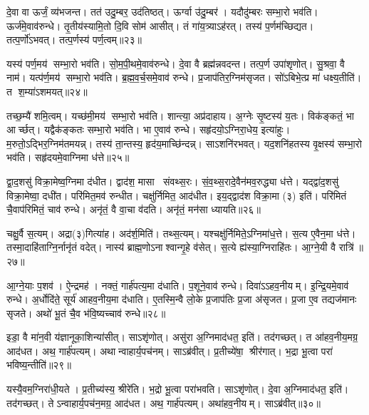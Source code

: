 दे॒वा वा ऊर्जं॒ व्य॑भजन्त। तत॑ उदु॒म्बर॒ उद॑तिष्ठत्। ऊर्ग्वा उ॑दु॒म्बर॑। यदौदु॑म्बरः सम्भा॒रो भव॑ति। ऊर्ज॑मे॒वाव॑रुन्धे। तृ॒तीय॑स्यामि॒तो दि॒वि सोम॑ आसीत्। तं गा॑य॒त्र्याऽह॑रत्। तस्य॑ प॒र्णम॑च्छिद्यत। तत्प॒र्णो॑ऽभवत्। तत्प॒र्णस्य॑ पर्ण॒त्वम्॥२३॥

यस्य॑ पर्ण॒मय॑ सम्भा॒रो भव॑ति। सो॒म॒पी॒थमे॒वाव॑रुन्धे। दे॒वा वै ब्रह्म॑न्नवदन्त। तत्प॒र्ण उपा॑शृणोत्। सु॒श्रवा॒ वै नाम॑। यत्प॑र्ण॒मय॑ सम्भा॒रो भव॑ति। ब्र॒ह्म॒व॒र्च॒समे॒वाव॑ रुन्धे। प्र॒जाप॑तिर॒ग्निम॑सृजत। सो॑ऽबिभे॒त्प्र मा॑ धक्ष्य॒तीति॑। त श॒म्या॑ऽशमयत्॥२४॥

तच्छ॒म्यै॑ शमि॒त्वम्। यच्छ॑मी॒मय॑ सम्भा॒रो भव॑ति। शान्त्या॒ अप्र॑दाहाय। अ॒ग्नेः सृ॒ष्टस्य॑ य॒तः। विक॑ङ्कतं॒ भा आर्च्छत्। यद्वैक॑ङ्कतः सम्भा॒रो भव॑ति। भा ए॒वाव॑ रुन्धे। सहृ॑दयो॒ऽग्निरा॒धेय॒ इत्या॑हुः। म॒रुतो॒ऽद्भिर॒ग्निम॑तमयन्न्। तस्य॑ ता॒न्तस्य॒ हृद॑य॒माच्छि॑न्दन्न्। साऽशनि॑रभवत्। यद॒शनि॑हतस्य वृ॒क्षस्य॑ सम्भा॒रो भव॑ति। सहृ॑दयमे॒वाग्निमा ध॑त्ते॥२५॥

द्वा॒द॒शसु॑ विक्रा॒मेष्व॒ग्निमा द॑धीत। द्वाद॑श॒ मासा संवथ्स॒रः। सं॒व॒थ्स॒रादे॒वैन॑मव॒रुद्ध्या ध॑त्ते। यद्द्वा॑द॒शसु॑ विक्रा॒मेष्वा॒ दधी॑त। परि॑मित॒मव॑ रुन्धीत। चक्षु॑र्निमित॒ आद॑धीत। इय॒द्द्वाद॑श विक्रा॒मा (३) इति॑। परि॑मितं चै॒वाप॑रिमितं॒ चाव॑ रुन्धे। अनृ॑तं॒ वै वा॒चा व॑दति। अनृ॑तं॒ मन॑सा ध्यायति॥२६॥

चक्षु॒र्वै स॒त्यम्। अद्रा(३)गित्या॑ह। अद॑र्\mbox{}श॒मिति॑। तथ्स॒त्यम्। यश्चक्षु॑र्निमिते॒ऽग्निमा॑ध॒त्ते। स॒त्य ए॒वैन॒मा ध॑त्ते। तस्मा॒दाहि॑ताग्नि॒र्नानृ॑तं वदेत्। नास्य॑ ब्राह्म॒णोऽनाश्वान्गृ॒हे व॑सेत्। स॒त्ये ह्य॑स्या॒ग्निराहि॑तः। आ॒ग्ने॒यी वै रात्रि॑॥२७॥

आ॒ग्ने॒याः प॒शव॑। ऐ॒न्द्रमह॑। नक्तं॒ गार्\mbox{}ह॑पत्य॒मा द॑धाति। प॒शूने॒वाव॑ रुन्धे। दिवा॑ऽऽहव॒नीयम्। इ॒न्द्रि॒यमे॒वाव॑ रुन्धे। अ॒र्धोदि॑ते॒ सूर्य॑ आहव॒नीय॒मा द॑धाति। ए॒तस्मि॒न्वै लो॒के प्र॒जाप॑तिः प्र॒जा अ॑सृजत। प्र॒जा ए॒व तद्यज॑मानः सृजते। अथो॑ भू॒तं चै॒व भ॑वि॒ष्यच्चाव॑ रुन्धे॥२८॥

इडा॒ वै मा॑न॒वी य॑ज्ञानूका॒शिन्या॑सीत्। साऽशृ॑णोत्। असु॑रा अ॒ग्निमाद॑धत॒ इति॑। तद॑गच्छत्। त आ॑हव॒नीय॒मग्र॒ आद॑धत। अथ॒ गार्\mbox{}ह॑पत्यम्। अथान्वाहार्य॒पच॑नम्। साऽब्र॑वीत्। प्र॒तीच्ये॑षा॒ श्रीर॑गात्। भ॒द्रा भू॒त्वा परा॑ भविष्य॒न्तीति॑॥२९॥

यस्यै॒वम॒ग्निरा॑धी॒यते। प्र॒तीच्य॑स्य॒ श्रीरे॑ति। भ॒द्रो भू॒त्वा परा॑भवति। साऽशृ॑णोत्। दे॒वा अ॒ग्निमाद॑धत॒ इति॑। तद॑गच्छत्। तेऽन्वाहार्य॒पच॑न॒मग्र॒ आद॑धत। अथ॒ गार्\mbox{}ह॑पत्यम्। अथा॑हव॒नीयम्। साऽब्र॑वीत्॥३०॥

